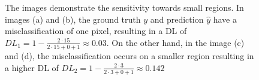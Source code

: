 \begin{figure}[H]
  \caption[Sensitivity towards small region of \ac{DL}]{The images demonstrate the sensitivity towards small regions. In images (a) and (b), the ground truth $y$ and prediction $\hat{y}$ have a misclassification of one pixel, resulting in a \ac{DL} of $DL_1=1-\frac{2\cdot 15}{2\cdot 15 + 0 + 1}\approx 0.03$. On the other hand, in the image (c) and (d), the misclassification occurs on a smaller region resulting in a higher \ac{DL} of $DL_2=1-\frac{2\cdot 3}{2\cdot 3 + 0 + 1}\approx 0.142$}
  \label{dice_limit_3}
\end{figure}
